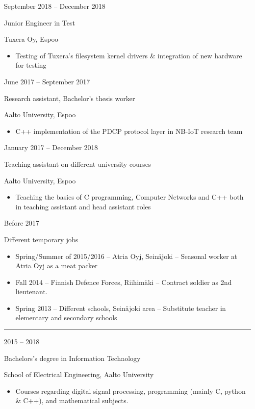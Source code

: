 \documentclass[a4paper,hidelinks,10pt]{article}
\newlength{\cvcolumngapwidth}
\newlength{\cvleftcolumnwidth}
\newlength{\cvrightcolumnwidth}
\newcommand{\cvsectionstyle}[1]{{\normalsize\cvsectionfont\textcolor{cvsectioncolor}{#1}}}
\newcommand{\cvtitlestyle}[1]{{\large\cvtitlefont\textcolor{cvtitlecolor}{#1}}}
\newcommand{\cvdurationstyle}[1]{{\small\cvdurationfont\textcolor{cvdurationcolor}{#1}}}
\newlength{\cvafteritemskipamount}
\newlength{\cvaftersectionskipamount}
\newlength{\cvaftertitleskipamount}
\newlength{\cvparskip}
\newcommand{\cvsection}[1]{
    \begin{minipage}[t]{\cvleftcolumnwidth}
        \raggedleft\cvsectionstyle{#1}
    \end{minipage}%
    \hspace{\cvcolumngapwidth}%
    \begin{minipage}[t]{\cvrightcolumnwidth}
        \textcolor{cvrulecolor}{\rule{\cvrightcolumnwidth}{0.3mm}}
    \end{minipage}

    \vspace{\cvaftersectionskipamount}
}
\newcommand{\cvitem}[2]{
    \begin{minipage}[t]{\cvleftcolumnwidth}
        \raggedleft #1
    \end{minipage}%
    \hspace{\cvcolumngapwidth}%
    \begin{minipage}[t]{\cvrightcolumnwidth}
        \setlength{\parskip}{\cvparskip} #2
    \end{minipage}

    \vspace{\cvafteritemskipamount}
}
\newcommand{\cvtitle}[1]{
    \cvtitlestyle{#1}

    \vspace{\cvaftertitleskipamount}
    \vspace{-\cvparskip}
}
\begin{document}
\cvitem{
    \cvdurationstyle{September  2018 -- December 2018}
}{
    \cvtitle{Junior Engineer in Test}

    Tuxera Oy, Espoo

    \begin{itemize}[leftmargin=*]
        \item Testing of Tuxera's filesystem kernel drivers \& integration of new hardware for testing
    \end{itemize}
}


\cvitem{
    \cvdurationstyle{June 2017 -- September 2017}
}{
    \cvtitle{Research assistant, Bachelor's thesis worker}

    Aalto University, Espoo

    \begin{itemize}[leftmargin=*]
        \item C++ implementation of the PDCP protocol layer in NB-IoT research team
    \end{itemize}
}

\cvitem{
    \cvdurationstyle{January 2017 -- December 2018}
}{
    \cvtitle{Teaching assistant on different university courses}

    Aalto University, Espoo

    \begin{itemize}[leftmargin=*]
        \item Teaching the basics of C programming, Computer Networks and C++ both in teaching assistant and head assistant roles
    \end{itemize}
}


\cvitem{
    \cvdurationstyle{Before 2017}
}{
    \cvtitle{Different temporary jobs}

    \begin{itemize}[leftmargin=*]
        \item Spring/Summer of 2015/2016 -- Atria Oyj, Seinäjoki -- Seasonal worker at Atria Oyj as a meat packer
        \item Fall 2014 -- Finnish Defence Forces, Riihimäki -- Contract soldier as 2nd lieutenant.
        \item Spring 2013 -- Different schools, Seinäjoki area -- Substitute teacher in elementary and secondary schools
    \end{itemize}
}



\cvsection{EDUCATION}


\cvitem{
    \cvdurationstyle{2015 -- 2018}
}{
    \cvtitle{Bachelors's degree in Information Technology}

    School of Electrical Engineering, Aalto University

    \begin{itemize}[leftmargin=*]
        \item Courses regarding digital signal processing, programming (mainly C, python \& C++), and mathematical subjects.
    \end{itemize}
}
\end{document}

